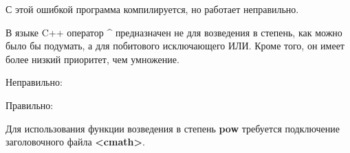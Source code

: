 \begin{typerror}
	\label{TE_xor-as-power}

	С этой ошибкой программа компилируется, но работает неправильно.

	В языке C++ оператор \textbf{\^} предназначен не для возведения в степень,
	как можно было бы подумать, а для побитового исключающего ИЛИ.
	Кроме того, он имеет более низкий приоритет, чем умножение.

	Неправильно:

	Правильно:

	Для использования функции возведения в степень \textbf{pow} требуется подключение заголовочного файла \textbf{<cmath>}.
\end{typerror}
